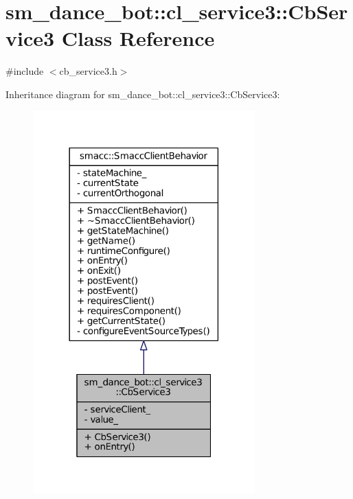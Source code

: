 \hypertarget{classsm__dance__bot_1_1cl__service3_1_1CbService3}{}\section{sm\+\_\+dance\+\_\+bot\+:\+:cl\+\_\+service3\+:\+:Cb\+Service3 Class Reference}
\label{classsm__dance__bot_1_1cl__service3_1_1CbService3}


{\ttfamily \#include $<$cb\+\_\+service3.\+h$>$}



Inheritance diagram for sm\+\_\+dance\+\_\+bot\+:\+:cl\+\_\+service3\+:\+:Cb\+Service3\+:
\nopagebreak
\begin{figure}[H]
\begin{center}
\leavevmode
\includegraphics[width=242pt]{classsm__dance__bot_1_1cl__service3_1_1CbService3__inherit__graph}
\end{center}
\end{figure}


